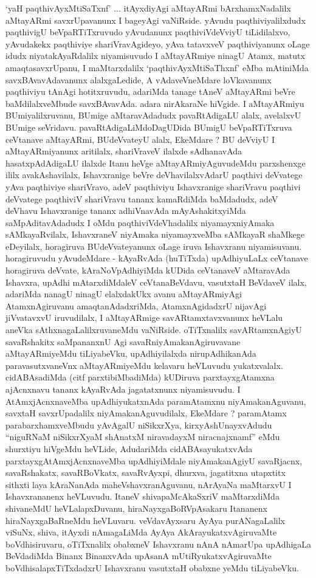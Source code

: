 \begin{artha}
`yaH paqthivAyxMtiSaTxnf' ... itAyxdiyAgi aMtayARmi bArxhamxNadalilx aMta\-yARmi savxrUpavanunx I bageyAgi vaNiRside. yAvudu paqthiviyalilxdudx \-paqthivigU beVpaRTiTxruvudo yAvudanunx paqthiviVdeVviyU tiLidilalxvo, yAvu\-dakekx paqthiviye shariVravAgideyo, yAva tatavxveV paqthiviyanunx oLage idudx niyata\-kAyaRdalilx niyamisuvudo I aMtayARmiye ninagU Atamx, matutx amaqta\-savxrUpanu, I maMtarxdalilx `paqthivAyxMtiSaThxnf' eMba mAtiniMda savxBAvavAdavanunx alalxgaLedide, A vAdaveVneMdare loVkavanunx paqthiviyu tAnAgi hotitxruvudu, adariMda tanage tAneV aMtayARmi beVre baMdilalxveMbude savxBAvavAda. adara nirAkaraNe hiVgide. I aMtayARmiyu BUmiyalilxruvanu, BUmige aMtara\-vAdadudx pavaRtAdigaLU alalx, avelalxvU BUmige seVridavu. pavaRtAdigaLiMdo\-DagUDida BUmigU beVpaRTiTxruva ceVtanave aMtayARmi, BUdeVvateyU alalx, EkeMdare ? BU deVviyU I aMtayARmiyanunx aritilalx, shariVraveV ilalxde sAdhanavAda hasatxpAdAdigaLU ilalxde Itanu heVge aMtayARmiyAgu\-vudeMdu parxshenxge ililx avakAshavilalx, Ishavxranige beVre deVhavilalxvAdarU paqthivi \-deVvatege yAva paqthiviye shariVravo, adeV paqthiviyu Ishavxranige shariVravu paqthivi deVvatege paqthiviV shariVravu tananx kamaRdiMda baMdadudx, adeV deVhavu Ishavxranige tananx adhiVnavAda mAyAshakitxyiMda saMpAditavAdadudx I oMdu paqthiviVdeVha\-dalilx niyamayxniyAmaka sAMkayaRvilalx, IshavxraneV niyAmaka niyamayxveMba sAMkayaR shaMkege eDeyilalx, horagiruva BUdeVvateyanunx oLage iruva Ishavxra\-nu niyamisuvanu. horagiruvudu yAvudeMdare - kAyaRvAda (huTiTxda) upAdhiyuLaLx ceVtanave horagiruva deVvate, kAraNoVpAdhiyiMda kUDida \break ceVtanaveV aMtaravAda Ishavxra, upAdhi mAtarxdiMdaleV ceVtanaBeVdavu, \-vasutxtaH BeVdaveV ilalx, adariMda nanagU ninagU elalxdakUkx avanu aMtayARmiyAgi AtamxnAgiruvanu amaqtanAdadxriMda, AtamxnAgidadxrU nijavAgi jiVvatavxvU iruvu\-dilalx, I aMtayARmige savARtamxtavxvanunx heVLalu aneVka sAthxnagaLalilxruvaneMdu vaNiRside. oTiTxnalilx savARtamxnAgiyU savaRshakitx saMpananxnU Agi savaRniyAmaka\-nAgiruvavane aMtayARmiyeMdu tiLiyabeVku, upAdhiyilalxda nirupAdhika\-nAda paravasutxvaneVnx aMtayARmiyeMdu kelavaru heVLuvudu yukatxvalalx. cidA\-BAsadiMda (citf parxtibiMbadiMda) kUDiruva parxtayxgAtamxna ajAcnxnavu tananx kAyaR\-vAda jagatatxnunx niyamisuvudu. I AtAmxjAcnxnaveMba upAdhiyukatxnAda para\-mAtamxnu niyAmakanAguvanu, savxtaH savxrUpadalilx niyAmakanAguvudilalx, \-EkeMdare ? paramAtamx parabarxhamxveMbudu yAvAgalU niSikxrXya, kirxyAshUnayxvAdudu \-``niguRNaM niSikxrXyaM shAnatxM niravadayxM niracnajxnamf'' eMdu shurxtiyu hiVgeMdu heVLide, AdudariMda cidABAsayukatxvAda parxtayxgAtAmxjAcnxnaveMba upAdhi\-yiMdale niyAmakanAgiyU savaRjacnx, savaRshakatx, savaRBoVkatx, savaRvAyxpi, dhurxva, jagatitxna utapxtitx sithxti laya kAraNanAda maheVshavxranAguvanu, nArAyaNa maMtarxvU I Ishavxrananenx heVLuvudu. ItaneV shivapaMcAkaSxriV maMtarxdiMda shivaneMdU heVLalapxDu\-vanu, hiraNayxgaBoRVpAsakaru Itananenx hiraNayxgaBaRneMdu heVLuvaru. veVdavAyxsa\-ru AyAya purANagaLalilx viSuNx, shiva, itAyxdi nAmagaLiMda AyAya AkAra\-yukatxvAgiruvaMte boVdhisiruvaru, oTiTxnalilx obabxneV Ishavxranu nAnA nAmarUpa upAdhigaLa BeVdadiMda Binanx BinanxvAda upAsanA mUtiRyukatxvAgiruvaMte boVdhisalapxTiTxdadxrU Ishavxranu vasutxtaH obabxne yeMdu tiLiyabeVku.
\end{artha}

